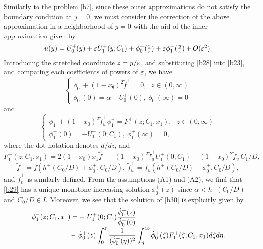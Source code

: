 \documentclass[a4,10pt]{article}
\begin{document}
Similarly to the problem \eqref{b7}, since these outer approximations do not satisfy the boundary condition at $y = 0$, 
we must consider the correction of the above approximation in a neighborhood of $y = 0$ 
with the aid of the inner approximation given by 
%
\begin{equation}\label{b28}
\begin{array}{l}
u(y)  =  U^+_0(y) + \varepsilon U^+_1(y;C_1) + \phi^+_0( \frac{y}{\varepsilon}) 
+  \varepsilon \phi^+_1(  \frac{y}{\varepsilon} ) + O(\varepsilon^2).
\end{array}
\end{equation}
%
%
Introducing the stretched coordinate $z = y/\varepsilon$, and substituting 
\eqref{b28} into \eqref{b23}, and 
comparing each coefficients of powers of $\varepsilon$, we have 
%
\begin{equation}\label{b29}
\left \{
\begin{array}{l}
\ddot{\phi}_0^+ + (1-x_0)^2 \tilde{f}^+ = 0, \ \ \ z \in (0, \infty)  
 \\[1ex]
\phi^+_0(0) = \alpha - U^+_0(0), \  \phi^+_0(\infty) = 0 \ 
\end{array} 
\right.
\end{equation}
%
and
%
\begin{equation}\label{b30}
\left \{
\begin{array}{l}
\ddot{\phi}_1^+ + (1-x_0)^2 \tilde{f}^+_u \phi^+_1 = F_1^+(z;C_1,x_1), \ \ \ z \in (0, \infty)  
 \\[1ex]
 \phi^+_1(0) = -U^+_1(0;C_1), \ \phi^+_1(\infty) = 0, \
\end{array} 
\right.
\end{equation}
%
where the dot notation denotes $d/dz$, and 
%
$$
F_1^+(z;C_1,x_1) =  2(1-x_0) x_1 \tilde{f}^+ - (1- x_0)^2 \tilde{f}^+_u U^+_1(0;C_1) 
-(1-x_0)^2 \tilde{f}^+_v C_1/D ,
$$
%
%
$$ \tilde{f}^+ = f( h^+(C_0/D) + \phi^+_0, C_0/D ), \ 
\tilde{f}^+_u = f_u( h^+(C_0/D) + \phi^+_0, C_0/D ),
$$
%
and $\tilde{f}^+_v$ is similarly defined.
From the assumptions (A1) and (A2), 
we find that \eqref{b29} has a unique monotone
increasing solution $\phi^+_0(z)$ since $\alpha < h^+(C_0/D)$ and $C_0/D \in I$. 
Moreover, we see that the solution of \eqref{b30} is explicitly given by
%
\begin{equation}\label{b32}
\begin{array}{l}
\phi^+_1(z;C_1,x_1) = - \ U^+_1(0;C_1) \displaystyle\frac{ \dot{\phi}_0^+(z) }{ \dot{\phi}_0^+(0) } \\[2ex]
\hspace*{2cm} - \ \dot{\phi}_0^+(z)  \displaystyle\int_0^z \frac{1}{ (\dot{\phi}_0^+(\eta))^2} 
\displaystyle\int_{\eta}^{\infty}  \dot{\phi}_0^+(\zeta) 
F_1^+(\zeta;C_1,x_1) d\zeta d\eta. 
\end{array} 
\end{equation}
%
\end{document}
